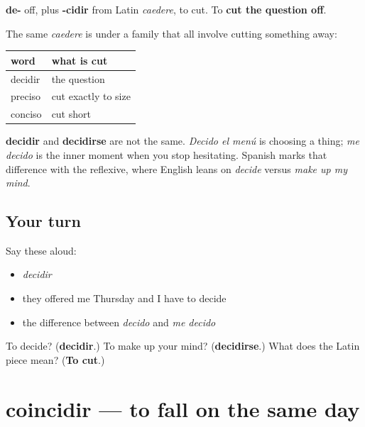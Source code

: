 \begin{cousinweb}
\textbf{de-} off, plus \textbf{-cidir} from Latin \emph{caedere}, to cut. To \textbf{cut the question off}.

The same \emph{caedere} is under a family that all involve cutting something away:

\noindent
\begin{tabularx}{\linewidth}{@{}>{\raggedright\arraybackslash}X>{\raggedright\arraybackslash}X@{}}
\toprule
\textbf{word} & \textbf{what is cut} \\
\midrule
decidir & the question \\
preciso & cut exactly to size \\
conciso & cut short \\
\bottomrule
\end{tabularx}

\textbf{decidir} and \textbf{decidirse} are not the same. \emph{Decido el menú} is choosing a thing; \emph{me decido} is the inner moment when you stop hesitating. Spanish marks that difference with the reflexive, where English leans on \emph{decide} versus \emph{make up my mind}.
\end{cousinweb}

\subsection*{Your turn}
Say these aloud:

\begin{itemize}
\raggedright
  \item \emph{decidir}
  \item they offered me Thursday and I have to decide
  \item the difference between \emph{decido} and \emph{me decido}
\end{itemize}

\begin{tcolorbox}[breakable,colback=teal!4,colframe=teal!35!black,title={Before you move on}]
To decide? (\textbf{decidir}.) To make up your mind? (\textbf{decidirse}.) What does the Latin piece mean? (\textbf{To cut}.)
\end{tcolorbox}
\section[coincidir]{coincidir — to fall on the same day}

\label{lesson:ES-C437-coincidir}



